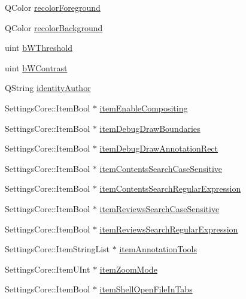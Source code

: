 \begin{DoxyCompactItemize}
\item 
Q\+Color \hyperlink{classOkular_1_1SettingsPrivate_ac188f8afa6c36f3be06278295ef84d90}{recolor\+Foreground}
\item 
Q\+Color \hyperlink{classOkular_1_1SettingsPrivate_a4b7f7ebb712481217604970532e988f1}{recolor\+Background}
\item 
uint \hyperlink{classOkular_1_1SettingsPrivate_a4766bdd8fffc2b1b856e8f2404bd458e}{b\+W\+Threshold}
\item 
uint \hyperlink{classOkular_1_1SettingsPrivate_a6d2d6f06eb82a187c13840bcc55b1887}{b\+W\+Contrast}
\item 
Q\+String \hyperlink{classOkular_1_1SettingsPrivate_a98ccfc8d91cc610763eacca448467820}{identity\+Author}
\item 
Settings\+Core\+::\+Item\+Bool $\ast$ \hyperlink{classOkular_1_1SettingsPrivate_a5fd46d913aaaf8001026e7a4c6409910}{item\+Enable\+Compositing}
\item 
Settings\+Core\+::\+Item\+Bool $\ast$ \hyperlink{classOkular_1_1SettingsPrivate_a17c1efc22296d9ca79cb5e2b90beb840}{item\+Debug\+Draw\+Boundaries}
\item 
Settings\+Core\+::\+Item\+Bool $\ast$ \hyperlink{classOkular_1_1SettingsPrivate_aa2ab33eec8e6aaf70a5d5af48f242f01}{item\+Debug\+Draw\+Annotation\+Rect}
\item 
Settings\+Core\+::\+Item\+Bool $\ast$ \hyperlink{classOkular_1_1SettingsPrivate_a31bdbcadec0d77d5f5ce1083d8d70232}{item\+Contents\+Search\+Case\+Sensitive}
\item 
Settings\+Core\+::\+Item\+Bool $\ast$ \hyperlink{classOkular_1_1SettingsPrivate_a220f3128585d9da070425c49a650d9e1}{item\+Contents\+Search\+Regular\+Expression}
\item 
Settings\+Core\+::\+Item\+Bool $\ast$ \hyperlink{classOkular_1_1SettingsPrivate_a205618e6d9770cb40fa7073561cf1bff}{item\+Reviews\+Search\+Case\+Sensitive}
\item 
Settings\+Core\+::\+Item\+Bool $\ast$ \hyperlink{classOkular_1_1SettingsPrivate_ae5a97eef0f44ac55fbf6366c6b9e0e0e}{item\+Reviews\+Search\+Regular\+Expression}
\item 
Settings\+Core\+::\+Item\+String\+List $\ast$ \hyperlink{classOkular_1_1SettingsPrivate_a7e00c8908af893f273be9102ad3c6b73}{item\+Annotation\+Tools}
\item 
Settings\+Core\+::\+Item\+U\+Int $\ast$ \hyperlink{classOkular_1_1SettingsPrivate_a63b3fe05c0719de0f94cfbab41d4f52e}{item\+Zoom\+Mode}
\item 
Settings\+Core\+::\+Item\+Bool $\ast$ \hyperlink{classOkular_1_1SettingsPrivate_a7f0d51eecbcf19e89af1b8fe777873e3}{item\+Shell\+Open\+File\+In\+Tabs}

\end{DoxyCompactItemize}
